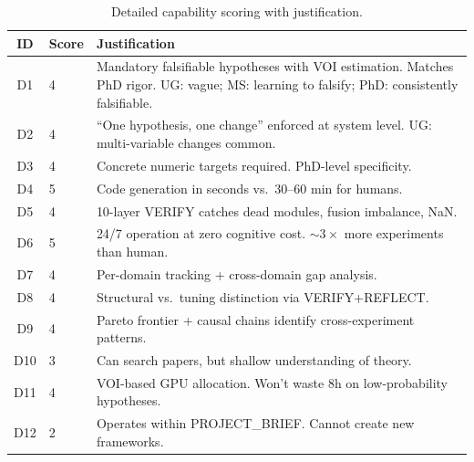 \documentclass[11pt,a4paper]{article}
\begin{document}
\begin{table}[h]
\centering
\footnotesize
\begin{threeparttable}
\caption{Detailed capability scoring with justification.}
\label{tab:human_detailed}
\begin{tabularx}{\linewidth}{c l X}
\toprule
\textbf{ID} & \textbf{Score} & \textbf{Justification} \\
\midrule
D1 & 4 & Mandatory falsifiable hypotheses with VOI estimation. Matches PhD rigor. UG: vague; MS: learning to falsify; PhD: consistently falsifiable. \\
D2 & 4 & ``One hypothesis, one change'' enforced at system level. UG: multi-variable changes common. \\
D3 & 4 & Concrete numeric targets required. PhD-level specificity. \\
D4 & 5 & Code generation in seconds vs.\ 30--60 min for humans. \\
D5 & 4 & 10-layer VERIFY catches dead modules, fusion imbalance, NaN. \\
D6 & 5 & 24/7 operation at zero cognitive cost. ${\sim}3\times$ more experiments than human. \\
D7 & 4 & Per-domain tracking + cross-domain gap analysis. \\
D8 & 4 & Structural vs.\ tuning distinction via VERIFY+REFLECT. \\
D9 & 4 & Pareto frontier + causal chains identify cross-experiment patterns. \\
D10 & 3 & Can search papers, but shallow understanding of theory. \\
D11 & 4 & VOI-based GPU allocation. Won't waste 8h on low-probability hypotheses. \\
D12 & 2 & Operates within PROJECT\_BRIEF. Cannot create new frameworks. \\
\bottomrule
\end{tabularx}
\end{threeparttable}
\end{table}
\end{document}
